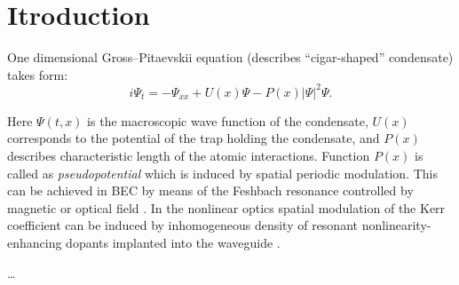 
\chapter*{Itroduction}

One dimensional Gross--Pitaevskii equation (describes ``cigar-shaped'' condensate) takes form:
\begin{equation}
	i \Psi_t = -\Psi_{xx} + U(x) \Psi - P(x) |\Psi|^2 \Psi.
\label{eq:gross-pitaevskii}
\end{equation}

Here $\Psi(t, x)$ is the macroscopic wave function of the condensate, $U(x)$ corresponds to the potential of the trap holding the condensate, and $P(x)$ describes characteristic length of the atomic interactions.
Function $P(x)$ is called as {\it pseudopotential} which is induced by spatial periodic modulation.
This can be achieved in BEC by means of the Feshbach resonance controlled by magnetic or optical field \cite{PollackDriesJunkerChenCorcovilosHulet, ChinGrimmJulienneTsienga, BauerLetterVoRempeDurr}.
In the nonlinear optics spatial modulation of the Kerr coefficient can be induced by inhomogeneous density of resonant nonlinearity-enhancing dopants implanted into the waveguide \cite{HukriedeRundeKip}.

\dots

